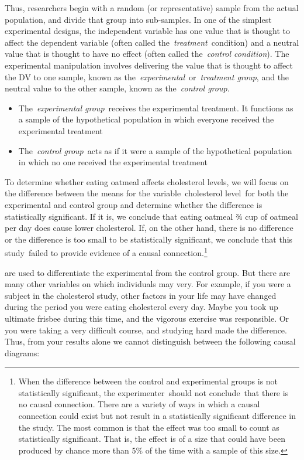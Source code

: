 \begin{refsection}
Thus, researchers begin with a random (or representative) sample from the actual population, and divide that group into sub-samples. In one of the simplest experimental designs, the independent variable has one value that is thought to affect the dependent variable (often called the \emph{treatment} condition) and a neutral value that is thought to have no effect (often called the \emph{control condition}). The experimental manipulation involves delivering the value that is thought to affect the DV to one sample, known as the \emph{experimental} or \emph{treatment group}, and the neutral value to the other sample, known as the \emph{control group}.

\begin{itemize}
\item The \emph{experimental group} receives the experimental treatment. It functions as a sample of the hypothetical population in which everyone received the experimental treatment

\item The \emph{control group} acts as if it were a sample of the hypothetical population in which no one received the experimental treatment

\end{itemize}

To determine whether eating oatmeal affects cholesterol levels, we will focus on the difference between the means for the variable cholesterol level for both the experimental and control group and determine whether the difference is statistically significant. If it is, we conclude that eating oatmeal ¾ cup of oatmeal per day does cause lower cholesterol. If, on the other hand, there is no difference or the difference is too small to be statistically significant, we conclude that this study failed to provide evidence of a causal connection.\footnote{When the difference between the control and experimental groups is not statistically significant, the experimenter should not conclude that there is no causal connection. There are a variety of ways in which a causal connection could exist but not result in a statistically significant difference in the study. The most common is that the effect was too small to count as statistically significant. That is, the effect is of a size that could have been produced by chance more than 5\% of the time with a sample of this size.}

 are used to differentiate the experimental from the control group. But there are many other variables on which individuals may very. For example, if you were a subject in the cholesterol study, other factors in your life may have changed during the period you were eating cholesterol every day. Maybe you took up ultimate frisbee during this time, and the vigorous exercise was responsible. Or you were taking a very difficult course, and studying hard made the difference. Thus, from your results alone we cannot distinguish between the following causal diagrams:


\end{refsection}
